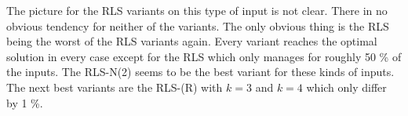 The picture for the RLS variants on this type of input is not clear.
There in no obvious tendency for neither of the variants.
The only obvious thing is the RLS being the worst of the RLS variants again.
Every variant reaches the optimal solution in every case except for the RLS which only manages for roughly 50 \% of the inputs.
The RLS-N(2) seems to be the best variant for these kinds of inputs.
The next best variants are the RLS-(R) with $k=3$ and $k=4$ which only differ by 1 \%.
